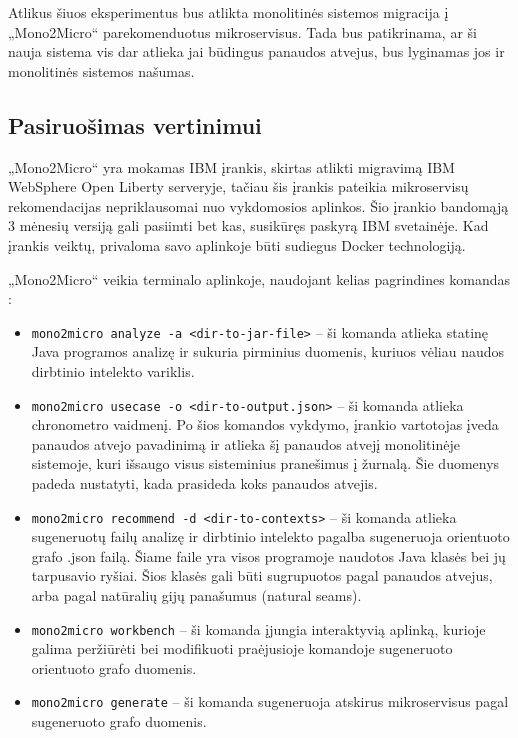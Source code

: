 \documentclass{VUMIFPSbakalaurinis}
\begin{document}
Atlikus šiuos eksperimentus bus atlikta monolitinės sistemos migracija į „Mono2Micro“ parekomenduotus mikroservisus. Tada bus patikrinama, ar ši nauja sistema vis dar atlieka jai būdingus panaudos atvejus, bus lyginamas jos ir monolitinės sistemos našumas.

\subsection{Pasiruošimas vertinimui}
„Mono2Micro“ yra mokamas IBM įrankis, skirtas atlikti migravimą IBM WebSphere Open Liberty serveryje, tačiau šis įrankis pateikia mikroservisų rekomendacijas nepriklausomai nuo vykdomosios aplinkos. Šio įrankio bandomąją 3 mėnesių versiją gali pasiimti bet kas, susikūręs paskyrą IBM svetainėje. Kad įrankis veiktų, privaloma savo aplinkoje būti sudiegus Docker technologiją. 

„Mono2Micro“ veikia terminalo aplinkoje, naudojant kelias pagrindines komandas \cite{IBMM2M}:
\begin{itemize}
    \item \verb|mono2micro analyze -a <dir-to-jar-file>| -- ši komanda atlieka statinę Java programos analizę ir sukuria pirminius duomenis, kuriuos vėliau naudos dirbtinio intelekto variklis.

    \item \verb|mono2micro usecase -o <dir-to-output.json>| -- ši komanda atlieka chronometro vaidmenį. Po šios komandos vykdymo, įrankio vartotojas įveda panaudos atvejo pavadinimą ir atlieka šį panaudos atvejį monolitinėje sistemoje, kuri išsaugo visus sisteminius pranešimus į žurnalą. Šie duomenys padeda nustatyti, kada prasideda koks panaudos atvejis.

    \item \verb|mono2micro recommend -d <dir-to-contexts>| -- ši komanda atlieka sugeneruotų failų analizę ir dirbtinio intelekto pagalba sugeneruoja orientuoto grafo .json failą. Šiame faile yra visos programoje naudotos Java klasės bei jų tarpusavio ryšiai. Šios klasės gali būti sugrupuotos pagal panaudos atvejus, arba pagal natūralių gijų panašumus (natural seams).

    \item \verb|mono2micro workbench| -- ši komanda įjungia interaktyvią aplinką, kurioje galima peržiūrėti bei modifikuoti praėjusioje komandoje sugeneruoto orientuoto grafo duomenis.

    \item \verb|mono2micro generate| -- ši komanda sugeneruoja atskirus mikroservisus pagal sugeneruoto grafo duomenis.
\end{itemize}
\end{document}
